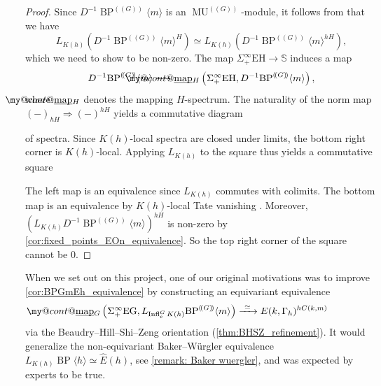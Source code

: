 \documentclass[a4paper, 10pt]{article}
\makeatletter
\renewcommand{\S}{\mathbb S}
\newcommand{\MU}{\operatorname{MU}}
\newcommand{\MUG}{{\MU^{(\!(G)\!)}}}
\newcommand{\BPGm}{{\BP^{(\!(G)\!)}}\langle m\rangle}
\newcommand{\BP}{\operatorname{BP}}
\newcommand{\map}{\operatorname{map}}
\newcommand{\Infl}{\operatorname{Infl}}
\DeclareRobustCommand{\myuline}[2][0pt]{%
  \ifmmode
    \uline{\hphantom{#2}\kern-#1}%
    \kern#1%
    \mathllap{\mathpalette\my@cont@{#2}}%
  \else
    \uline{\phantom{#2}\kern-#1}%
    \kern#1%
    \llap{\contour{white}{#2}}%
  \fi
}
\newcommand{\ul}{\myuline}
\newcommand{\my@cont@}[2]{\contour{white}{\mbox{$\m@th#1#2$}}}
\theoremstyle{definition}
\makeatother
\begin{document}
\begin{proof}
    Since $D^{-1} \BPGm$ is an \(\MUG\)-module, it follows from \cite[Theorem 2.14]{carrick2025higherrealktheoriesfinite} that we have 
    \[ L_{K(h)}\left(D^{-1}\BPGm^{H}\right) \simeq L_{K(h)}\left(D^{-1}\BPGm^{hH}\right), \]
    which we need to show to be non-zero. The map $\Sigma_+^{\infty} \mathrm{EH} \to \S$ induces a map
    \[ D^{-1} \BPGm \longrightarrow \ul{\map}_H \left(\Sigma_+^{\infty} \mathrm{EH}, D^{-1}\BPGm \right), \]
    where $\ul{\map}_H$ denotes the mapping $H$-spectrum. The naturality of the norm map $(-)_{hH} \Rightarrow (-)^{hH}$ yields a commutative diagram
    \begin{center}
    \end{center}
    of spectra. Since $K(h)$-local spectra are closed under limits, the bottom right corner is $K(h)$-local. Applying $L_{K(h)}$ to the square thus yields a commutative square
    \begin{center}
    \end{center}
    The left map is an equivalence since $L_{K(h)}$ commutes with colimits. The bottom map is an equivalence by $K(h)$-local Tate vanishing \cite{greenleesSadofsky1996tate, hoveySadofsky1996tate}. Moreover, $\left(L_{K(h)} D^{-1} \BPGm \right)^{hH}$ is non-zero by \cref{cor:fixed_points_EOn_equivalence}. So the top right corner of the square cannot be $0$.
\end{proof}

When we set out on this project, one of our original motivations was to improve \cref{cor:BPGmEh_equivalence} by constructing an equivariant equivalence 
\[
\ul{\map}_G \left(\Sigma_+^{\infty} \mathrm{EG}, L_{\Infl_e^G K(h)} \BPGm \right) \xrightarrow{\ \simeq \ } E(k,\Gamma_h)^{hC(k,m)}
\]
via the Beaudry--Hill--Shi--Zeng orientation (\cref{thm:BHSZ_refinement}). It would generalize the non-equivariant Baker--Würgler equivalence $L_{K(h)} \BP \langle h \rangle \simeq \widehat{E}(h)$, see \cref{remark: Baker wuergler}, and was expected by experts to be true.
\end{document}
